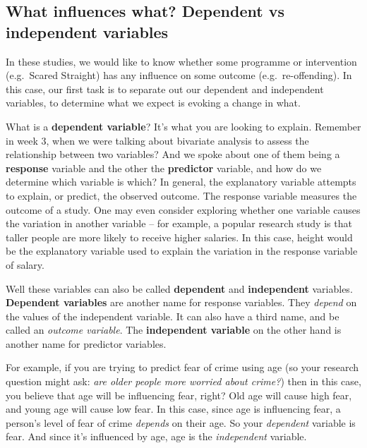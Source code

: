 \documentclass[
]{book}
\begin{document}
\hypertarget{what-influences-what-dependent-vs-independent-variables}{%
\subsection{What influences what? Dependent vs independent variables}\label{what-influences-what-dependent-vs-independent-variables}}

In these studies, we would like to know whether some programme or intervention (e.g.~Scared Straight) has any influence on some outcome (e.g.~re-offending). In this case, our first task is to separate out our dependent and independent variables, to determine what we expect is evoking a change in what.

What is a \textbf{dependent variable}? It's what you are looking to explain. Remember in week 3, when we were talking about bivariate analysis to assess the relationship between two variables? And we spoke about one of them being a \textbf{response} variable and the other the \textbf{predictor} variable, and how do we determine which variable is which? In general, the explanatory variable attempts to explain, or predict, the observed outcome. The response variable measures the outcome of a study. One may even consider exploring whether one variable causes the variation in another variable -- for example, a popular research study is that taller people are more likely to receive higher salaries. In this case, height would be the explanatory variable used to explain the variation in the response variable of salary.

Well these variables can also be called \textbf{dependent} and \textbf{independent} variables. \textbf{Dependent variables} are another name for response variables. They \emph{depend} on the values of the independent variable. It can also have a third name, and be called an \emph{outcome variable}. The \textbf{independent variable} on the other hand is another name for predictor variables.

For example, if you are trying to predict fear of crime using age (so your research question might ask: \emph{are older people more worried about crime?}) then in this case, you believe that age will be influencing fear, right? Old age will cause high fear, and young age will cause low fear. In this case, since age is influencing fear, a person's level of fear of crime \emph{depends} on their age. So your \emph{dependent} variable is fear. And since it's influenced by age, age is the \emph{independent} variable.
\end{document}
